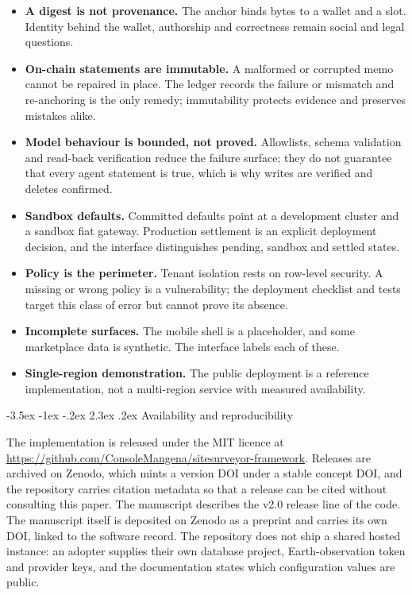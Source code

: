 \documentclass[10pt,a4paper,twocolumn]{article}
\makeatletter
\renewcommand\section{\@startsection{section}{1}{\z@}
  {-3.5ex \@plus -1ex \@minus -.2ex}
  {2.3ex \@plus.2ex}
  {\normalfont\Large\bfseries\hyphenpenalty=10000\exhyphenpenalty=10000}}
\makeatother
\begin{document}
\begin{itemize}
  \item \textbf{A digest is not provenance.} The anchor binds bytes to a wallet and a
        slot. Identity behind the wallet, authorship and correctness remain social and
        legal questions.
  \item \textbf{On-chain statements are immutable.} A malformed or corrupted memo
        cannot be repaired in place. The ledger records the failure or mismatch and
        re-anchoring is the only remedy; immutability protects evidence and preserves
        mistakes alike.
  \item \textbf{Model behaviour is bounded, not proved.} Allowlists, schema validation
        and read-back verification reduce the failure surface; they do not guarantee
        that every agent statement is true, which is why writes are verified and
        deletes confirmed.
  \item \textbf{Sandbox defaults.} Committed defaults point at a development cluster
        and a sandbox fiat gateway. Production settlement is an explicit deployment
        decision, and the interface distinguishes pending, sandbox and settled states.
  \item \textbf{Policy is the perimeter.} Tenant isolation rests on row-level security.
        A missing or wrong policy is a vulnerability; the deployment checklist and
        tests target this class of error but cannot prove its absence.
  \item \textbf{Incomplete surfaces.} The mobile shell is a placeholder, and some
        marketplace data is synthetic. The interface labels each of these.
  \item \textbf{Single-region demonstration.} The public deployment is a reference
        implementation, not a multi-region service with measured availability.
\end{itemize}

\section{Availability and reproducibility}
\label{sec:availability}

\begin{sloppypar}
The implementation is released under the MIT licence at
\url{https://github.com/ConsoleMangena/sitesurveyor-framework}. Releases are archived
on Zenodo, which mints a version DOI under a stable concept DOI, and the repository
carries citation metadata so that a release can be cited without consulting this
paper. The manuscript describes the v2.0 release line of the code. The manuscript itself is deposited on Zenodo as a preprint and carries its own
DOI, linked to the software record. The repository does not ship a shared hosted
instance: an adopter supplies their own database project, Earth-observation token and
provider keys, and the documentation states which configuration values are public.
\end{sloppypar}
\end{document}
